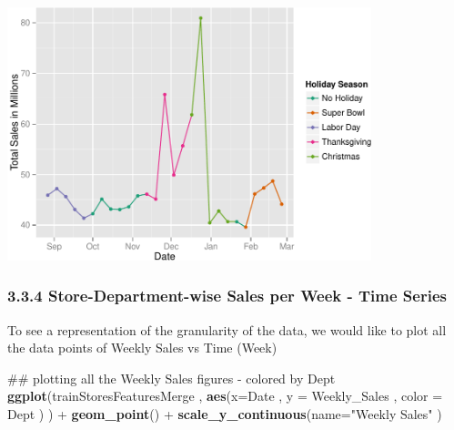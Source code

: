 \documentclass[]{article}
\newenvironment{Shaded}{\begin{snugshade}}{\end{snugshade}}
\newcommand{\KeywordTok}[1]{\textcolor[rgb]{0.13,0.29,0.53}{\textbf{{#1}}}}
\newcommand{\DataTypeTok}[1]{\textcolor[rgb]{0.13,0.29,0.53}{{#1}}}
\newcommand{\StringTok}[1]{\textcolor[rgb]{0.31,0.60,0.02}{{#1}}}
\newcommand{\OtherTok}[1]{\textcolor[rgb]{0.56,0.35,0.01}{{#1}}}
\newcommand{\NormalTok}[1]{{#1}}
\begin{document}
\includegraphics[width=400px]{PredictingWeeklySalesAtWalmart_files/figure-latex/plottingSubsetOfHolidays-1}

\begin{Shaded}
\end{Shaded}

\subsubsection{3.3.4 Store-Department-wise Sales per Week - Time
Series}\label{store-department-wise-sales-per-week---time-series}

To see a representation of the granularity of the data, we would like to
plot all the data points of Weekly Sales vs Time (Week)

\begin{Shaded}
\begin{Highlighting}[]
\NormalTok{## plotting all the Weekly Sales figures - colored by Dept}
\KeywordTok{ggplot}\NormalTok{(trainStoresFeaturesMerge , }
       \KeywordTok{aes}\NormalTok{(}\DataTypeTok{x=}\NormalTok{Date , }\DataTypeTok{y =} \NormalTok{Weekly_Sales , }\DataTypeTok{color =} \NormalTok{Dept ) ) +}
\StringTok{  }\KeywordTok{geom_point}\NormalTok{() +}
\StringTok{  }\KeywordTok{scale_y_continuous}\NormalTok{(}\DataTypeTok{name=}\StringTok{"Weekly Sales"} \NormalTok{)}
\end{Highlighting}
\end{Shaded}
\end{document}
